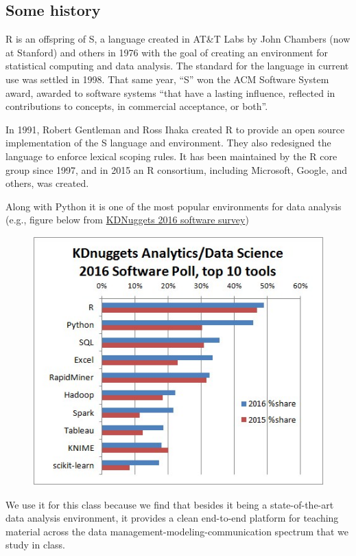 \documentclass[]{article}
\theoremstyle{definition}
\theoremstyle{definition}
\theoremstyle{remark}
\begin{document}
\subsection{Some history}\label{some-history}

R is an offspring of S, a language created in AT\&T Labs by John
Chambers (now at Stanford) and others in 1976 with the goal of creating
an environment for statistical computing and data analysis. The standard
for the language in current use was settled in 1998. That same year,
``S'' won the ACM Software System award, awarded to software systems
``that have a lasting influence, reflected in contributions to concepts,
in commercial acceptance, or both''.

In 1991, Robert Gentleman and Ross Ihaka created R to provide an open
source implementation of the S language and environment. They also
redesigned the language to enforce lexical scoping rules. It has been
maintained by the R core group since 1997, and in 2015 an R consortium,
including Microsoft, Google, and others, was created.

Along with Python it is one of the most popular environments for data
analysis (e.g., figure below from
\href{http://www.kdnuggets.com/2016/06/r-python-top-analytics-data-mining-data-science-software.html}{KDNuggets
2016 software survey})

\begin{figure}[htbp]
\centering
\includegraphics{img/kdnuggets-2016.jpg}
\caption{}
\end{figure}

We use it for this class because we find that besides it being a
state-of-the-art data analysis environment, it provides a clean
end-to-end platform for teaching material across the data
management-modeling-communication spectrum that we study in class.
\end{document}
